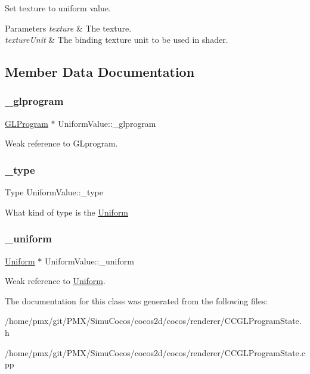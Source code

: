 Set texture to uniform value. 
\begin{DoxyParams}{Parameters}
{\em texture} & The texture. \\
\hline
{\em texture\+Unit} & The binding texture unit to be used in shader. \\
\hline
\end{DoxyParams}


\subsection{Member Data Documentation}
\mbox{\label{classUniformValue_ab00f2e9c022f1318f6dc708c5e82fa65}} 
\subsubsection{\texorpdfstring{\+\_\+glprogram}{\_glprogram}}
{\footnotesize\ttfamily \hyperlink{classGLProgram}{G\+L\+Program} $\ast$ Uniform\+Value\+::\+\_\+glprogram\hspace{0.3cm}{\ttfamily [protected]}}

Weak reference to G\+Lprogram. \mbox{\label{classUniformValue_a0438b9746276d6e62bb5969bad9402fc}} 
\subsubsection{\texorpdfstring{\+\_\+type}{\_type}}
{\footnotesize\ttfamily Type Uniform\+Value\+::\+\_\+type\hspace{0.3cm}{\ttfamily [protected]}}

What kind of type is the \hyperlink{structUniform}{Uniform} \mbox{\label{classUniformValue_a6767cfe53473b732f6d35e9c51e3420e}} 
\subsubsection{\texorpdfstring{\+\_\+uniform}{\_uniform}}
{\footnotesize\ttfamily \hyperlink{structUniform}{Uniform} $\ast$ Uniform\+Value\+::\+\_\+uniform\hspace{0.3cm}{\ttfamily [protected]}}

Weak reference to \hyperlink{structUniform}{Uniform}. 

The documentation for this class was generated from the following files\+:\begin{DoxyCompactItemize}
\item 
/home/pmx/git/\+P\+M\+X/\+Simu\+Cocos/cocos2d/cocos/renderer/C\+C\+G\+L\+Program\+State.\+h\item 
/home/pmx/git/\+P\+M\+X/\+Simu\+Cocos/cocos2d/cocos/renderer/C\+C\+G\+L\+Program\+State.\+cpp\end{DoxyCompactItemize}

